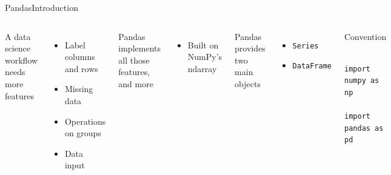 \documentclass[10pt,compress]{beamer} %
\begin{document}
\begin{frame}[fragile]{Pandas}{Introduction}
	\begin{columns}

	A data science workflow needs more features
	\begin{itemize}
		\item Label columns and rows
		\item Missing data
		\item Operations on groups
		\item Data input
	\end{itemize}
	Pandas implements all those features, and more
	\begin{itemize}
		\item Built on NumPy's ndarray
	\end{itemize}
	Pandas provides two main objects
	\begin{itemize}
		\item \texttt{Series}
		\item \texttt{DataFrame}
	\end{itemize}

		\begin{block}{\footnotesize{Convention}}
		\vspace{-0.2cm} 
			\begin{lstlisting}
			import numpy as np
			import pandas as pd
			\end{lstlisting}
		\vspace{-0.2cm} 
		\end{block}
	\end{columns}
\end{frame}
\end{document}
